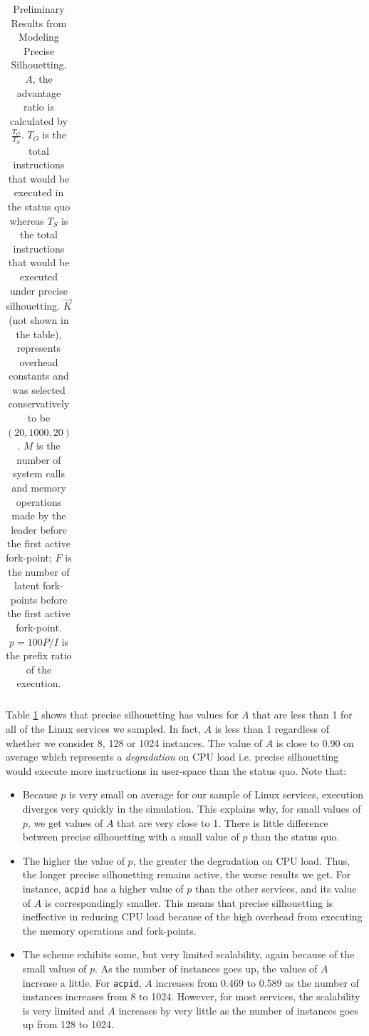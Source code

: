 \begin{table} [t]
\begin{center}
\begin{tabular}{|l||c|c||c||c|c|c||c||c|}
\end{tabular}
  \caption{\hspace{0.2in}Preliminary Results from Modeling Precise Silhouetting.\newline 
    $A$, the advantage ratio is calculated by $\frac{T_O}{T_S}$.
    $T_O$ is the total instructions that would be executed in the status quo whereas $T_S$ is the total instructions that would be executed under
    precise silhouetting. $\vec K$ (not shown in the table), represents overhead constants and was selected conservatively
    to be $(20,1000,20)$. $M$ is the number of system calls and memory operations made by the leader before the first active fork-point; $F$
    is the number of latent fork-points before the first active fork-point. $p = 100P/I$ is
    the prefix ratio of the execution. }

\label{ps:inittbl}

\end{center}
\end{table}

Table \ref{ps:inittbl} shows that precise silhouetting has 
values for $A$ that are less than 1 for all of the Linux
services we sampled. In fact, $A$ is less than 1 regardless
of whether we consider 8, 128 or 1024 instances. 
The value of $A$ is close to 0.90 on average which represents a {\em degradation}
on CPU load i.e. precise silhouetting would execute more instructions
in user-space than the status quo.
Note that:
\begin{itemize}
\item Because $p$ is very small on average for our sample of Linux services, 
  execution diverges very quickly in the simulation. This explains
  why, for small values of $p$, we get values of $A$ that are very
  close to 1. There is little difference between 
  precise silhouetting with a small value of $p$ than
  the status quo.
\item The higher the value of $p$, the greater the degradation
  on CPU load. Thus, the longer precise silhouetting remains
  active, the worse results we get. For instance,
  \texttt{acpid} has a higher value of $p$ than the other
  services, and its value of $A$ is correspondingly smaller. 
  This means that precise silhouetting is ineffective
  in reducing CPU load because of the high overhead
  from executing the memory operations and fork-points.
\item The scheme exhibits some, but very limited
  scalability, again because of the small values of $p$.
  As the number of instances goes up, the values of $A$ 
  increase a little. For \texttt{acpid}, $A$ increases
  from 0.469 to 0.589 as the number of instances
  increases from 8 to 1024. However,
  for most services, the scalability is very limited
  and $A$ increases by very little as the number of instances
  goes up from 128 to 1024.
\end{itemize}

